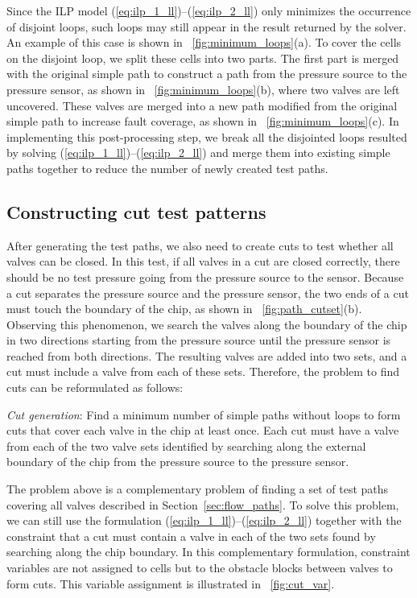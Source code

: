 \documentclass[journal,twoside]{IEEEtran}
\begin{document}
Since the ILP model (\ref{eq:ilp_1_ll})--(\ref{eq:ilp_2_ll}) only minimizes
the occurrence of disjoint loops, such loops may still appear in the result returned
by the solver. An example of this case is shown in \figname~\ref{fig:minimum_loops}(a). 
To cover the cells on the disjoint loop, we split these cells into two parts.
The first part is merged with the original simple path to construct a path 
from the pressure source to the pressure sensor, as shown in  
\figname~\ref{fig:minimum_loops}(b), where two valves are left uncovered. These
valves are merged into a new path modified from the original simple path to
increase fault coverage, as shown in \figname~\ref{fig:minimum_loops}(c). In
implementing this post-processing step, we break all the disjointed loops resulted by
solving (\ref{eq:ilp_1_ll})--(\ref{eq:ilp_2_ll}) and merge them into existing
simple paths together to reduce the number of newly created test paths.

\subsection{Constructing cut test patterns}\label{sec:cut}

After generating the test paths, we also need to create cuts to test whether
all valves can be closed. In this test, if all valves in a cut are closed
correctly, there should be no test pressure going from the pressure source to
the sensor. Because a cut separates the pressure source and the pressure sensor, 
the two ends of a cut must touch the boundary of the chip, as
shown in \figname~\ref{fig:path_cutset}(b).
Observing this phenomenon, we search the valves along the
boundary of the chip in two directions starting from the pressure source 
until the pressure sensor is reached from both directions.
The resulting valves are added into two sets, and 
a cut must include a valve from each of these sets. 
Therefore, the problem to find cuts can be reformulated as follows:

\textit{Cut generation}:  Find a minimum number of simple paths without loops
to form cuts that cover each valve in the chip at least once.  Each cut must
have a valve from each of the two valve sets identified by searching along the
external boundary of the chip from the pressure source to the pressure sensor.

The problem above is a complementary problem of finding a set of test paths
covering all valves described in Section~\ref{sec:flow_paths}.  To solve this
problem, we can still use the formulation
(\ref{eq:ilp_1_ll})--(\ref{eq:ilp_2_ll})
together with the constraint that a cut must contain a valve in each of the
two sets found by searching along the chip boundary. 
In this complementary formulation, constraint variables are not assigned to cells 
but to the obstacle blocks between valves to form cuts.
This variable assignment is illustrated in \figname~\ref{fig:cut_var}.
\end{document}
